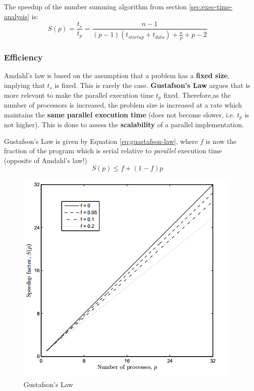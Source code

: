 \documentclass{article}
\begin{document}
The speedup of the number summing algorithm from section \ref{sec:exec-time-analysis} is:
\begin{equation}
	S(p) = \frac{t_s}{t_p} = \frac{n - 1}{(p - 1)(t_{startup} + t_{data}) + \frac{n}{p} + p - 2}
\end{equation}

\subsubsection{Efficiency}

Amdahl's law is based on the assumption that a problem has a \textbf{fixed size}, implying that $t_s$ is fixed. This is rarely the case. \textbf{Gustafson's Law} argues that is more relevant to make the parallel execution time $t_p$ fixed. Therefore,as the number of processors is increased, the problem size is increased at a rate which maintains the \textbf{same parallel execution time} (does not become slower, i.e. $t_p$ is not higher). This is done to assess the \textbf{scalability} of a parallel implementation.

Gustafson's Law is given by Equation \ref{eq:guastafson-law}, where $f$ is now the fraction of the program which is serial relative to \textit{parallel} execution time (opposite of Amdahl's law!)
\begin{equation}
	S(p) \leq f + (1 - f)p
	\label{eq:guastafson-law}
\end{equation}

\begin{figure}
	\centering
	\includegraphics[scale=0.7]{figures/gustafson-law.png}
	\caption{Gustafson's Law}
	\label{fig:gustafson}
\end{figure}
\end{document}
